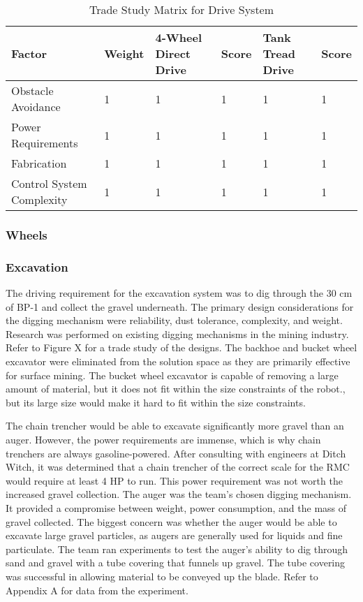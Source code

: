 \documentclass[class=article, crop=false]{standalone}
\begin{document}
\FloatBarrier
	\begin{table}[h]
	\centering
	\begin{tabular}{ | m{8em} | m{5em} | m{5em} | m{5em} | m{5em} | m{5em} | } 
 	\hline
 		\rowcolor[gray]{0.8}
 		\textbf{Factor} &\textbf{Weight} &\textbf{4-Wheel Direct Drive} &\textbf{Score} &\textbf{Tank Tread Drive} &\textbf{Score}  \\ 
 		\hline
 		Obstacle Avoidance&1&1&1&1&1 \\ 
 		\hline
 		Power Requirements&1&1&1&1&1 \\ 
 		\hline
 		Fabrication&1&1&1&1&1 \\ 
 		\hline
 		Control System Complexity&1&1&1&1&1 \\
 		\hline
	\end{tabular}
	\caption{Trade Study Matrix for Drive System }
		\label{table:drive_trade_study}
	\end{table}
	\FloatBarrier
	
	\subsubsection{Wheels}
	
	\subsubsection{Excavation}
	The driving requirement for the excavation system was to dig through the 30 cm of BP-1 and collect the gravel underneath. The primary design considerations for the digging mechanism were reliability, dust tolerance, complexity, and weight. 
Research was performed on existing digging mechanisms in the mining industry. Refer to Figure X for a trade study of the designs. The backhoe and bucket wheel excavator were eliminated from the solution space as they are primarily effective for surface mining.  The bucket wheel excavator is capable of removing a large amount of material, but it does not fit within the size constraints of the robot., but its large size would make it hard to fit within the size constraints. 

The chain trencher would be able to excavate significantly more gravel than an auger. However, the power requirements are immense, which is why chain trenchers are always gasoline-powered. After consulting with engineers at Ditch Witch, it was determined that a chain trencher of the correct scale for the RMC would require at least 4 HP to run. This power requirement was not worth the increased gravel collection. 
The auger was the team’s chosen digging mechanism. It provided a compromise between weight, power consumption, and the mass of gravel collected. The biggest concern was whether the auger would be able to excavate large gravel particles, as augers are generally used for liquids and fine particulate. The team ran experiments to test the auger’s ability to dig through sand and gravel with a tube covering that funnels up gravel. The tube covering was successful in allowing material to be conveyed up the blade. Refer to Appendix A for data from the experiment.


	
	
	


	
\end{document}
